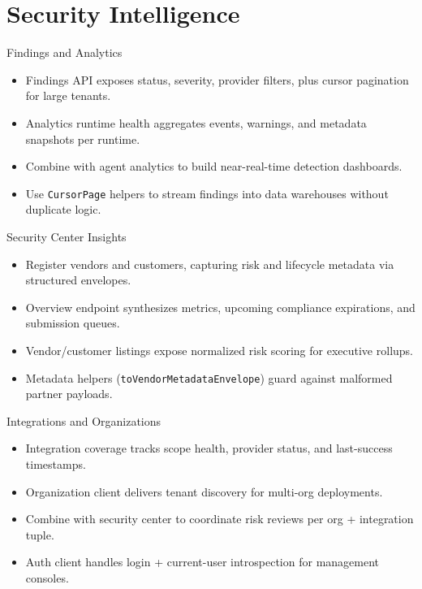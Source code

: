 \documentclass[aspectratio=169]{beamer}
\begin{document}
\section{Security Intelligence}

\begin{frame}{Findings and Analytics}
  \begin{itemize}
    \item Findings API exposes status, severity, provider filters, plus cursor pagination for large tenants.
    \item Analytics runtime health aggregates events, warnings, and metadata snapshots per runtime.
    \item Combine with agent analytics to build near-real-time detection dashboards.
    \item Use \texttt{CursorPage} helpers to stream findings into data warehouses without duplicate logic.
  \end{itemize}
\end{frame}

\begin{frame}{Security Center Insights}
  \begin{itemize}
    \item Register vendors and customers, capturing risk and lifecycle metadata via structured envelopes.
    \item Overview endpoint synthesizes metrics, upcoming compliance expirations, and submission queues.
    \item Vendor/customer listings expose normalized risk scoring for executive rollups.
    \item Metadata helpers (\texttt{toVendorMetadataEnvelope}) guard against malformed partner payloads.
  \end{itemize}
\end{frame}

\begin{frame}{Integrations and Organizations}
  \begin{itemize}
    \item Integration coverage tracks scope health, provider status, and last-success timestamps.
    \item Organization client delivers tenant discovery for multi-org deployments.
    \item Combine with security center to coordinate risk reviews per org + integration tuple.
    \item Auth client handles login + current-user introspection for management consoles.
  \end{itemize}
\end{frame}
\end{document}
